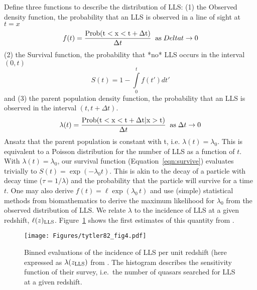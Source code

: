 \documentclass[graybox]{svmult}
\def\intl{\int\limits}
\begin{document}
Define three functions to describe the distribution of LLS:
(1)	the Observed density function, the probability that an LLS is observed
in a line of sight at $t=x$
\begin{equation}
f(t) = \frac{\rm Prob(t < x < t+\Delta t)}{\Delta t} \;\; 
\text{as} \; Delta t \to 0
\end{equation}
(2) the Survival function, the probability that *no* LLS occurs in the
interval $(0,t)$
\begin{equation}
S(t) = 1 - \intl_0^t f(t') dt'
\label{eqn:survive}
\end{equation}
and (3) the parent population density function, the probability that 
an LLS is observed in the interval $(t,t+\Delta t)$. 
\begin{equation}
\lambda(t) = \frac{\rm Prob(t < x < t+\Delta t|x>t)}{\Delta t} \;\; 
\text{as} \; \Delta t \to 0
\end{equation}
Ansatz that the parent population is constant with t, i.e.
$\lambda(t) = \lambda_0$.  This is equivalent to a Poisson
distribution for the number of LLS as a function of $t$.
With $\lambda(t) = \lambda_0$, our survival function
(Equation~\ref{eqn:survive}) evaluates trivially to 
$S(t) = \exp(-\lambda_0 t)$.  This is akin to the
decay of a particle with decay time ($\tau = 1/\lambda$)
and the probability that the particle will
survive for a time $t$.  One may also 
derive $f(t) = \ell \exp(\lambda_0 \, t)$
and use (simple) statistical methods from biomathematics
to derive the maximum likelihood for $\lambda_0$ from the
observed distribution of LLS.
We relate $\lambda$ to the incidence of LLS at a given 
redshift, $\ell(z)_{\rm LLS}$.  
Figure~\ref{fig:t82_fig4} shows the first estimates of
this quantity from \cite{tytler82}. 

%
\begin{figure}[b]
\sidecaption
\texttt{[image: Figures/tytler82\_fig4.pdf]}
%
%
\caption{Binned evaluations of the incidence of LLS per unit
redshift (here expressed as $\lambda(z_{\rm LLS})$ from
\cite{tytler82}.   The histogram describes the sensitivity
function of their survey, i.e.\ the number of quasars
searched for LLS at a given redshift.
}
\label{fig:t82_fig4}       %
\end{figure}
\end{document}
